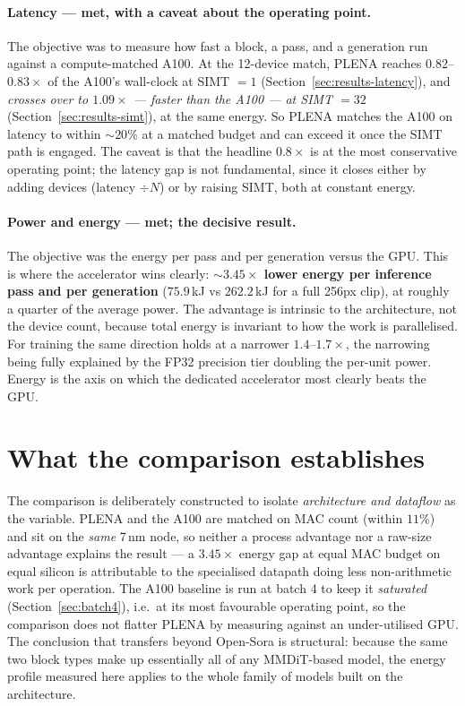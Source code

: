 \documentclass[11pt]{report}
\begin{document}
\paragraph{Latency --- met, with a caveat about the operating point.} The
objective was to measure how fast a block, a pass, and a generation run
against a compute-matched A100. At the 12-device match, PLENA reaches
$0.82$--$0.83\times$ of the A100's wall-clock at SIMT $=1$
(Section~\ref{sec:results-latency}), and \emph{crosses over to $1.09\times$
--- faster than the A100 --- at SIMT $=32$} (Section~\ref{sec:results-simt}),
at the same energy. So PLENA matches the A100 on latency to within ${\sim}20\%$
at a matched budget and can exceed it once the SIMT path is engaged. The
caveat is that the headline $0.8\times$ is at the most conservative operating
point; the latency gap is not fundamental, since it closes either by adding
devices (latency $\div N$) or by raising SIMT, both at constant energy.

\paragraph{Power and energy --- met; the decisive result.} The objective was
the energy per pass and per generation versus the GPU. This is where the
accelerator wins clearly: \textbf{${\sim}3.45\times$ lower energy per
inference pass and per generation} ($75.9$\,kJ vs $262.2$\,kJ for a full
256px clip), at roughly a quarter of the average power. The advantage is
intrinsic to the architecture, not the device count, because total energy is
invariant to how the work is parallelised. For training the same direction
holds at a narrower $1.4$--$1.7\times$, the narrowing being fully explained
by the FP32 precision tier doubling the per-unit power. Energy is the axis on
which the dedicated accelerator most clearly beats the GPU.

\section{What the comparison establishes}
\label{sec:eval-meaning}

The comparison is deliberately constructed to isolate \emph{architecture and
dataflow} as the variable. PLENA and the A100 are matched on MAC count
(within $11\%$) and sit on the \emph{same} 7\,nm node, so neither a process
advantage nor a raw-size advantage explains the result --- a $3.45\times$
energy gap at equal MAC budget on equal silicon is attributable to the
specialised datapath doing less non-arithmetic work per operation. The A100
baseline is run at batch 4 to keep it \emph{saturated}
(Section~\ref{sec:batch4}), i.e.\ at its most favourable operating point, so
the comparison does not flatter PLENA by measuring against an under-utilised
GPU. The conclusion that transfers beyond Open-Sora is structural: because
the same two block types make up essentially all of any MMDiT-based model, the
energy profile measured here applies to the whole family of models built on
the architecture.
\end{document}
